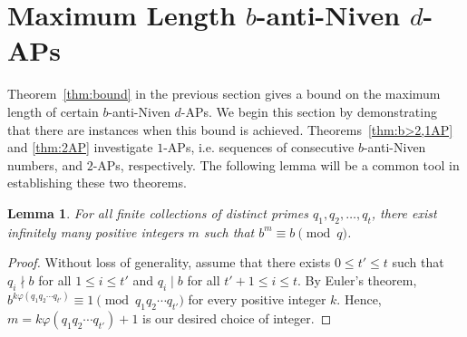 \documentclass[12pt]{article}
\newtheorem{theorem}{Theorem}[section]
\newtheorem{lemma}[theorem]{Lemma}
\theoremstyle{definition}
\begin{document}
\section{Maximum Length $b$-anti-Niven $d$-APs}\label{sec:dAP}
Theorem~\ref{thm:bound} in the previous section gives a bound on the maximum length of certain $b$-anti-Niven $d$-APs. We begin this section by demonstrating that there are instances when this bound is achieved.  Theorems~\ref{thm:b>2,1AP} and \ref{thm:2AP} investigate $1$-APs, i.e. sequences of consecutive $b$-anti-Niven numbers,  and $2$-APs, respectively. The following lemma will be a common tool in establishing these two theorems.

%
%

\begin{lemma}\label{lem:b^m=b}
For all finite collections of distinct primes $q_1,q_2,\dotsc,q_t$, there exist infinitely many positive integers $m$ such that $b^m\equiv b\pmod{q}$.
\end{lemma}
\begin{proof}
Without loss of generality, assume that there exists $0\leq t'\leq t$ such that $q_i\nmid b$ for all $1\leq i\leq t'$ and $q_i\mid b$ for all $t'+1\leq i\leq t$. By Euler's theorem, $b^{k\varphi(q_1q_2\dotsb q_{t'})}\equiv1\pmod{q_1q_2\dotsb q_{t'}}$ for every positive integer $k$. Hence, $m=k\varphi(q_1q_2\dotsb q_{t'})+1$ is our desired choice of integer.
\end{proof}
\end{document}
